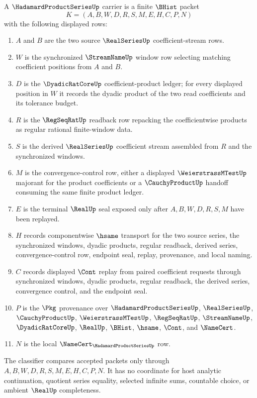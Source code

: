 \begin{definition}
\label{def:hadamard-product-series-carrier}
A $\HadamardProductSeriesUp$ carrier is a finite $\BHist$ packet
$$
K=(A,B,W,D,R,S,M,E,H,C,P,N)
$$
with the following displayed rows:
\begin{enumerate}
\item $A$ and $B$ are the two source $\RealSeriesUp$ coefficient-stream rows.
\item $W$ is the synchronized $\StreamNameUp$ window row selecting matching
coefficient positions from $A$ and $B$.
\item $D$ is the $\DyadicRatCoreUp$ coefficient-product ledger; for every
displayed position in $W$ it records the dyadic product of the two read
coefficients and its tolerance budget.
\item $R$ is the $\RegSeqRatUp$ readback row repacking the coefficientwise
products as regular rational finite-window data.
\item $S$ is the derived $\RealSeriesUp$ coefficient stream assembled from
$R$ and the synchronized windows.
\item $M$ is the convergence-control row, either a displayed
$\WeierstrassMTestUp$ majorant for the product coefficients or a
$\CauchyProductUp$ handoff consuming the same finite product ledger.
\item $E$ is the terminal $\RealUp$ seal exposed only after $A,B,W,D,R,S,M$
have been replayed.
\item $H$ records componentwise $\hsame$ transport for the two source series,
the synchronized windows, dyadic products, regular readback, derived series,
convergence-control row, endpoint seal, replay, provenance, and local naming.
\item $C$ records displayed $\Cont$ replay from paired coefficient requests
through synchronized windows, dyadic products, regular readback, the derived
series, convergence control, and the endpoint seal.
\item $P$ is the $\Pkg$ provenance over $\HadamardProductSeriesUp$,
$\RealSeriesUp$, $\CauchyProductUp$, $\WeierstrassMTestUp$, $\RegSeqRatUp$,
$\StreamNameUp$, $\DyadicRatCoreUp$, $\RealUp$, $\BHist$, $\hsame$, $\Cont$,
and $\NameCert$.
\item $N$ is the local $\NameCert_{\HadamardProductSeriesUp}$ row.
\end{enumerate}
The classifier compares accepted packets only through
$A,B,W,D,R,S,M,E,H,C,P,N$. It has no coordinate for host analytic
continuation, quotient series equality, selected infinite sums, countable
choice, or ambient $\RealUp$ completeness.
\end{definition}

